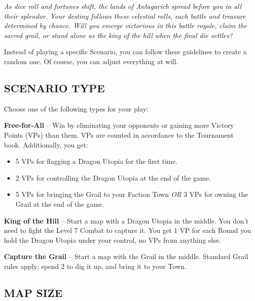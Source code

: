 
\begin{multicols}{2}

\textit{As dice roll and fortunes shift, the lands of Antagarich spread before you in all their splendor.
  Your destiny follows these celestial rolls, each battle and treasure determined by chance.
  Will you emerge victorious in this battle royale, claim the sacred grail, or stand alone as the king of the hill when the final die settles?  %
}

Instead of playing a specific Scenario, you can follow these guidelines to create a random one.
Of course, you can adjust everything at will.

\subsection*{\MakeUppercase{Scenario Type}}

Choose one of the following types for your play:

\textbf{Free-for-All} -- Win by eliminating your opponents or gaining more Victory Points (VPs) than them.
VPs are counted in accordance to the Tournament book.
Additionally, you get:
\begin{itemize}
  \item 5 VPs for flagging a Dragon Utopia for the first time.
  \item 2 VPs for controlling the Dragon Utopia at the end of the game.
  \item 5 VPs for bringing the Grail to your Faction Town \textit{OR} 3 VPs for owning the Grail  at the end of the game.
\end{itemize}

\textbf{King of the Hill} -- Start a map with a Dragon Utopia in the middle.
You don't need to fight the Level 7 Combat to capture it.
You get 1 VP for each Round you hold the Dragon Utopia under your control, no VPs from anything else.

\textbf{Capture the Grail} -- Start a map with the Grail in the middle.
Standard Grail rules apply: spend 2  to dig it up, and bring it to your Town.
\vspace*{\fill}
\columnbreak

\subsection*{\MakeUppercase{Map Size}}


\end{multicols}
